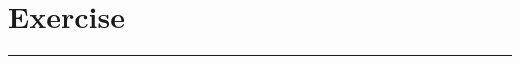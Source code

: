 \begin{enumerate}


\end{enumerate}
\newpage

\section{Exercise}
\vspace{-0.5cm}
\begin{center}
    \rule{\textwidth}{1pt}
\end{center}

